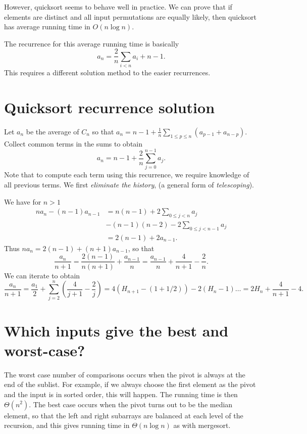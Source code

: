 However, quicksort seems to behave well in practice. We can prove that 
if elements are distinct and all input permutations are equally likely, then 
quicksort has average running time in $O(n \log n)$.

The recurrence for this average running time is basically
$$ a_n = \frac{2}{n} \sum_{i<n} a_i + n-1. $$ 
This requires a different solution method to the easier recurrences.

\section{Quicksort recurrence solution}
Let $a_n$ be the average of $C_n$ so that 
$a_n = n - 1 + \frac{1}{n} \sum_{1\leq p \leq n} (a_{p-1} + a_{n-p})$. 
Collect common terms in the sums to obtain
$$a_n = n - 1 + \frac{2}{n} \sum_{j=0}^{n-1} a_j.$$ 
Note that to compute each term using this recurrence, we require knowledge of all previous terms.
We first \emph{eliminate the history}, (a general form of \emph{telescoping}). 

We have for $n>1$
\begin{align*}
na_n - (n-1) a_{n-1} & = n(n-1) + 2 \sum_{0\leq j < n} a_j \\
& - (n-1)(n-2) - 2\sum_{0 \leq j < n - 1} a_j \\
& = 2(n - 1) + 2 a_{n-1}\text{.}
\end{align*}
Thus $na_n = 2(n - 1) + (n+1)a_{n-1}$, so that 
$$
\frac{a_n}{n+1} = \frac{2(n-1)}{n(n+1)} + \frac{a_{n-1}}{n} = 
\frac{a_{n-1}}{n} + \frac{4}{n+1} - \frac{2}{n}\text{.}
$$
We can iterate to obtain
$$\frac{a_n}{n+1} = \frac{a_1}{2} + \sum_{j=2}^n \left(\frac{4}{j+1} - 
\frac{2}{j}\right) = 4(H_{n+1} - (1+1/2)) - 2(H_n - 1)\dots = 2H_n + \frac{4}{n+1} - 4\text{.}$$

\section{Which inputs give the best and worst-case?}
The worst case number of comparisons occurs when the pivot is always at the end of the sublist. 
For example, if we always choose the first element as the pivot and the input is in sorted order, this will happen. 
The running time is then $\Theta(n^2)$. 
The best case occurs when the pivot turns out to be the median element, so that the left and right subarrays are balanced at each level of the recursion, 
and this gives running time in $\Theta(n\log n)$ as with mergesort.

